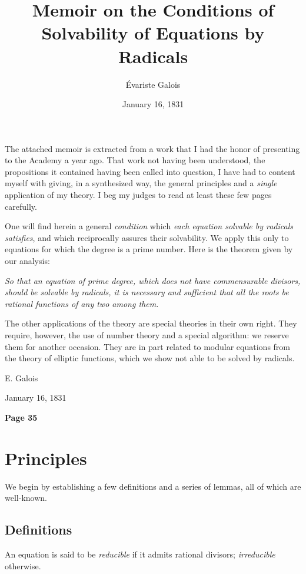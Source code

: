 \documentclass{article}
\title{Memoir on the Conditions of Solvability of Equations by Radicals}
\author{Évariste Galois}
\date{January 16, 1831}
\begin{document}
\maketitle

The attached memoir is extracted from a work that I had the honor of presenting to the Academy a year ago. That work not having been understood, the propositions it contained having been called into question, I have had to content myself with giving, in a synthesized way, the general principles and a \textit{single} application of my theory. I beg my judges to read at least these few pages carefully.

One will find herein a general \textit{condition} which \textit{each equation solvable by radicals satisfies}, and which reciprocally assures their solvability. We apply this only to equations for which the degree is a prime number. Here is the theorem given by our analysis:

\textit{So that an equation of prime degree, which does not have commensurable divisors, should be solvable by radicals, it is necessary and sufficient that all the roots be rational functions of any two among them.}

The other applications of the theory are special theories in their own right. They require, however, the use of number theory and a special algorithm: we reserve them for another occasion. They are in part related to modular equations from the theory of elliptic functions, which we show not able to be solved by radicals.

\begin{flushright}
E. Galois

January 16, 1831
\end{flushright}

\newpage


\centerline{\textbf{Page 35}}

\section*{Principles}

We begin by establishing a few definitions and a series of lemmas, all of which are well-known.

\subsection*{Definitions}

An equation is said to be \textit{reducible} if it admits rational divisors; \textit{irreducible} otherwise.
\end{document}
